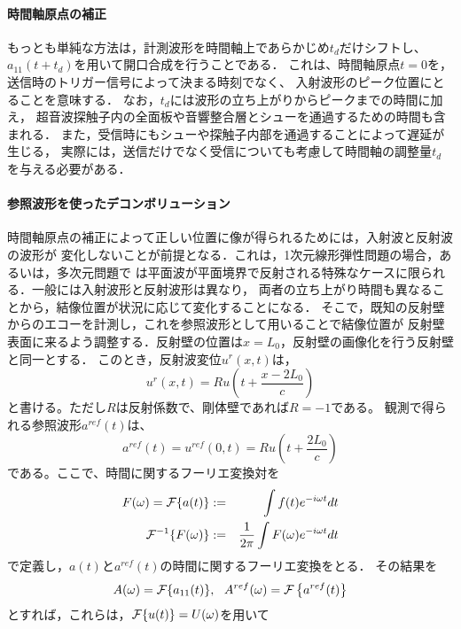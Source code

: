 \documentclass[10pt,a4j,dvipdfmx]{jarticle}
\begin{document}
\paragraph{時間軸原点の補正}
もっとも単純な方法は，計測波形を時間軸上であらかじめ$t_d$だけシフトし、
$a_{11}(t+t_d)$を用いて開口合成を行うことである．
これは、時間軸原点$t=0$を，送信時のトリガー信号によって決まる時刻でなく、
入射波形のピーク位置にとることを意味する．
なお，$t_d$には波形の立ち上がりからピークまでの時間に加え，
超音波探触子内の全面板や音響整合層とシューを通過するための時間も含まれる．
また，受信時にもシューや探触子内部を通過することによって遅延が生じる，
実際には，送信だけでなく受信についても考慮して時間軸の調整量$t_d$を与える必要がある．
\paragraph{参照波形を使ったデコンボリューション}
時間軸原点の補正によって正しい位置に像が得られるためには，入射波と反射波の波形が
変化しないことが前提となる．これは，1次元線形弾性問題の場合，あるいは，多次元問題で
は平面波が平面境界で反射される特殊なケースに限られる．一般には入射波形と反射波形は異なり，
両者の立ち上がり時間も異なることから，結像位置が状況に応じて変化することになる．
そこで，既知の反射壁からのエコーを計測し，これを参照波形として用いることで結像位置が
反射壁表面に来るよう調整する．反射壁の位置は$x=L_0$，反射壁の画像化を行う反射壁と同一とする．
このとき，反射波変位$u^{r}(x,t)$は，
\begin{equation}
	u^{r}(x,t)=Ru\left(t+\frac{x-2L_0}{c}\right)
	\label{eqn:}
\end{equation}
と書ける。ただし$R$は反射係数で、剛体壁であれば$R=-1$である。
観測で得られる参照波形$a^{ref}(t)$は、
\begin{equation}
	a^{ref}(t)=u^{ref}(0,t)=
	Ru\left(t+\frac{2L_0}{c}\right)
	\label{eqn:}
\end{equation}
である。ここで、時間に関するフーリエ変換対を
\begin{eqnarray}
	F(\omega)={\cal F}\{ a(t)\} &:=&  \int f(t)e^{-i\omega t} dt \\
	{\cal F}^{-1}\{ F(\omega)\} &:=&  \frac{1}{2\pi} \int F(\omega)e^{-i\omega t} dt 
\end{eqnarray}
で定義し，$a(t)$と$a^{ref}(t)$の時間に関するフーリエ変換をとる．
その結果を
\begin{equation}
	A(\omega)={\cal F}\{a_{11}(t)\}, \ \ 
	A^{ref}(\omega)={\cal F}\left\{ a^{ref}(t)\right\}
	\label{eqn:}
\end{equation}
とすれば，これらは，${\cal F}\{ u(t)\}=U(\omega)$を用いて
\end{document}
